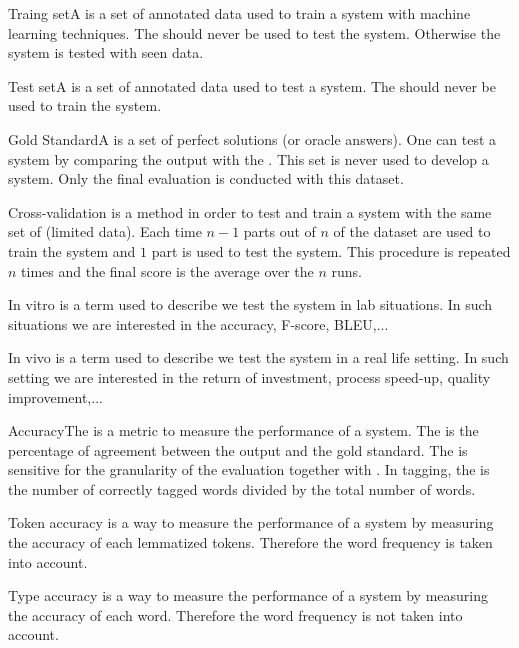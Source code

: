 \documentclass{article}
\begin{document}
\begin{df}{Traing set}A \sb{} is a set of annotated data used to train a system with machine learning techniques. The \sb{} should never be used to test the system. Otherwise the system is tested with seen data.
\end{df}
\begin{df}{Test set}A \sb{} is a set of annotated data used to test a system. The \sb{} should never be used to train the system.
\end{df}
\begin{df}{Gold Standard}A \sb{} is a set of perfect solutions (or oracle answers). One can test a system by comparing the output with the \sb{}. This set is never used to develop a system. Only the final evaluation is conducted with this dataset.
\end{df}
\begin{df}{Cross-validation}\sb{} is a method in order to test and train a system with the same set of (limited data). Each time $n-1$ parts out of $n$ of the dataset are used to train the system and $1$ part is used to test the system. This procedure is repeated $n$ times and the final score is the average over the $n$ runs.
\end{df}
\begin{df}{In vitro}\sb{} is a term used to describe we test the system in lab situations. In such situations we are interested in the accuracy, F-score, BLEU,...
\end{df}
\begin{df}{In vivo}\sb{} is a term used to describe we test the system in a real life setting. In such setting we are interested in the return of investment, process speed-up, quality improvement,...
\end{df}
\begin{df}{Accuracy}The \sb{} is a metric to measure the performance of a system. The \sb{} is the percentage of agreement between the output and the gold standard. The \sb{} is sensitive for the granularity of the evaluation together with . In \pos{} tagging, the \sb{} is the number of correctly tagged words divided by the total number of words.
\end{df}
\begin{df}{Token accuracy}\sb{} is a way to measure the performance of a system by measuring the accuracy of each lemmatized tokens. Therefore the word frequency is taken into account.
\end{df}
\begin{df}{Type accuracy}\sb{} is a way to measure the performance of a system by measuring the accuracy of each word. Therefore the word frequency is not taken into account.
\end{df}
\end{document}
